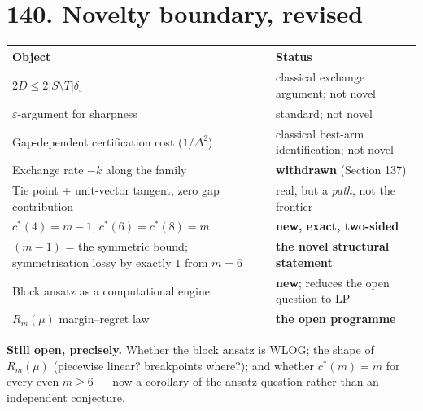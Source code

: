 \documentclass[9pt,twocolumn]{article}
\renewcommand{\_}{\CIGunderscore\allowbreak}
\begin{document}
\section*{140. Novelty boundary, revised}
\begin{center}\scriptsize
\begin{tabularx}{0.98\columnwidth}{X X}
\toprule
Object & Status\\
\midrule
$2D\le 2|S\setminus T|\delta_\square$ & classical exchange argument; not novel\\
$\varepsilon$-argument for sharpness & standard; not novel\\
Gap-dependent certification cost ($1/\Delta^2$) & classical best-arm identification; not novel\\
Exchange rate $-k$ along the family & \textbf{withdrawn} (Section 137)\\
Tie point + unit-vector tangent, zero gap contribution & real, but a \emph{path}, not the frontier\\
$c^\ast(4)=m-1$, $c^\ast(6)=c^\ast(8)=m$ & \textbf{new, exact, two-sided}\\
$(m-1)$ = the symmetric bound; symmetrisation lossy by exactly $1$ from $m=6$ & \textbf{the novel structural statement}\\
Block ansatz as a computational engine & \textbf{new}; reduces the open question to LP\\
$R_m(\mu)$ margin--regret law & \textbf{the open programme}\\
\bottomrule
\end{tabularx}
\end{center}
\textbf{Still open, precisely.} Whether the block ansatz is WLOG; the shape of $R_m(\mu)$ (piecewise linear? breakpoints where?); and whether $c^\ast(m)=m$ for every even $m\ge6$ --- now a corollary of the ansatz question rather than an independent conjecture.
\end{document}
